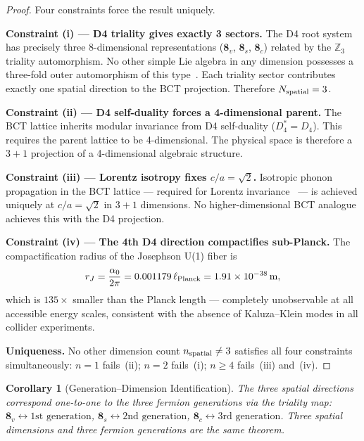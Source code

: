\documentclass[aps,prl,twocolumn,showpacs,superscriptaddress]{revtex4-2}
\newtheorem{corollary}[theorem]{Corollary}
\begin{document}
\begin{proof}
Four constraints force the result uniquely.

\textbf{Constraint (i) --- D4 triality gives exactly 3 sectors.}
The D4 root system has precisely three 8-dimensional representations
($\mathbf{8}_v$, $\mathbf{8}_s$, $\mathbf{8}_c$) related by the
$\mathbb{Z}_3$ triality automorphism. No other simple Lie algebra in
any dimension possesses a three-fold outer automorphism of this
type~\cite{L4}. Each triality sector contributes exactly one spatial
direction to the BCT projection. Therefore $N_{\rm spatial} = 3$.

\textbf{Constraint (ii) --- D4 self-duality forces a 4-dimensional
parent.} The BCT lattice inherits modular invariance from D4
self-duality ($D_4^* = D_4$). This requires the parent lattice to be
4-dimensional. The physical space is therefore a $3{+}1$ projection of
a 4-dimensional algebraic structure.

\textbf{Constraint (iii) --- Lorentz isotropy fixes $c/a = \sqrt{2}$.}
Isotropic phonon propagation in the BCT lattice --- required for
Lorentz invariance~\cite{L1} --- is achieved uniquely at $c/a = \sqrt{2}$
in $3{+}1$ dimensions. No higher-dimensional BCT analogue achieves
this with the D4 projection.

\textbf{Constraint (iv) --- The 4th D4 direction compactifies
sub-Planck.} The compactification radius of the Josephson U(1) fiber is
\begin{equation}
  r_J = \frac{\alpha_0}{2\pi}
      = 0.001179\,\ell_{\rm Planck}
      = 1.91\times 10^{-38}\,\text{m},
  \label{eq:rJ}
\end{equation}
which is $135\times$ smaller than the Planck length --- completely
unobservable at all accessible energy scales, consistent with the
absence of Kaluza--Klein modes in all collider experiments.

\textbf{Uniqueness.} No other dimension count $n_{\rm spatial} \neq 3$
satisfies all four constraints simultaneously: $n=1$ fails~(ii);
$n=2$ fails~(i); $n \geq 4$ fails~(iii) and~(iv).
\end{proof}

\begin{corollary}[Generation--Dimension Identification]
The three spatial directions correspond one-to-one to the three fermion
generations via the triality map:
$\mathbf{8}_v \leftrightarrow \text{1st generation}$,
$\mathbf{8}_s \leftrightarrow \text{2nd generation}$,
$\mathbf{8}_c \leftrightarrow \text{3rd generation}$.
Three spatial dimensions and three fermion generations are the same
theorem.
\end{corollary}
\end{document}
